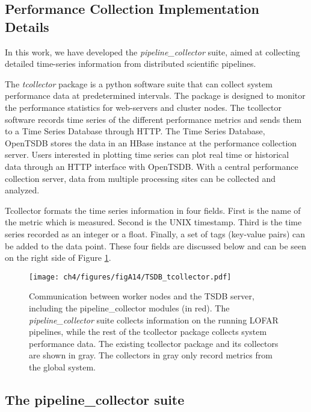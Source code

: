 
\begin{subappendices}

\section{Performance Collection Implementation Details}\label{sec:ch4_appendix1}


In this work, we have developed the \textit{pipeline\_collector} suite, aimed at collecting detailed time-series information from distributed scientific pipelines. 

The \textit{tcollector} package is a python software suite that can collect system performance data at predetermined intervals. The package is designed to monitor the performance statistics for web-servers and cluster nodes. The tcollector software records time series of the different performance metrics and sends them to a Time Series Database through HTTP. The Time Series Database, OpenTSDB stores the data in an HBase \citep{hbase} instance at the performance collection server. Users interested in plotting time series can plot real time or historical data through an HTTP interface with OpenTSDB. With a central performance collection server, data from multiple processing sites can be collected and analyzed. 

Tcollector formats the time series information in four fields. First is the name of the metric which is measured. Second is the UNIX timestamp. Third is the time series recorded as an integer or a float. Finally, a set of tags (key-value pairs) can be added to the data point. These four fields are discussed below and can be seen on the right side of Figure \ref{fig:ch4_tsdb_tcollector}. 

\begin{figure}[!h]
    \texttt{[image: ch4/figures/figA14/TSDB\_tcollector.pdf]}
      \caption{Communication between worker nodes and the TSDB server, including the pipeline\_collector modules (in red). The \textit{pipeline\_collector} suite collects information on the running LOFAR pipelines, while the rest of the tcollector package collects system performance data. The existing tcollector package and its collectors are shown in gray. The collectors in gray only record metrics from the global system. }
	\label{fig:ch4_tsdb_tcollector}
\end{figure}

\subsection{The pipeline\_collector suite}\label{sec:ch4_customcollectors}




\end{subappendices}
